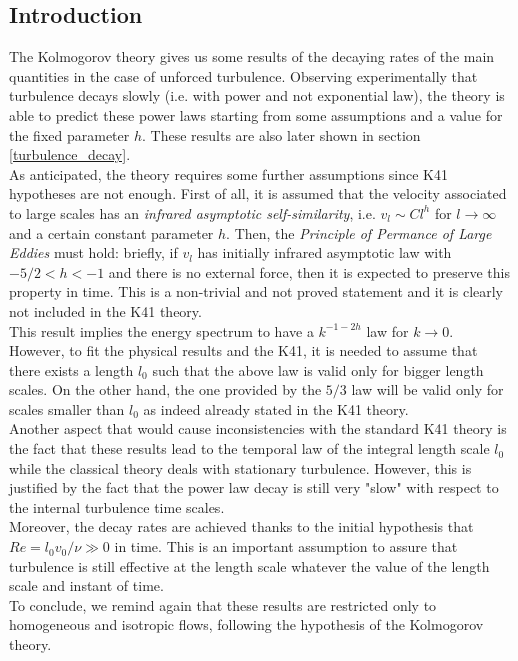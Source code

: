 \documentclass[11pt,titlepage]{article}
\begin{document}
\subsection{Introduction} %
The Kolmogorov theory gives us some results of the decaying rates of the main quantities in the case of unforced turbulence. Observing experimentally that turbulence decays slowly (i.e. with power and not exponential law), the theory is able to predict these power laws starting from some assumptions and a value for the fixed parameter $h$. These results are also later shown in section \ref{turbulence_decay}. \\
As anticipated, the theory requires some further assumptions since K41 hypotheses are not enough. First of all, it is assumed that the velocity associated to large scales has an \emph{infrared asymptotic self-similarity}, i.e. $v_l \sim Cl^h$ for $l \rightarrow \infty$ and a certain constant parameter $h$. Then, the \emph{Principle of Permance of Large Eddies} must hold: briefly, if $v_l$ has initially infrared asymptotic law with $-5/2 < h < -1$ and there is no external force, then it is expected to preserve this property in time. This is a non-trivial and not proved statement and it is clearly not included in the K41 theory. \\
This result implies the energy spectrum to have a $k^{-1-2h}$ law for $k\rightarrow 0$. However, to fit the physical results and the K41, it is needed to assume that there exists a length $l_0$ such that the above law is valid only for bigger length scales. On the other hand, the one provided by the $5/3$ law will be valid only for scales smaller than $l_0$ as indeed already stated in the K41 theory. \\
Another aspect that would cause inconsistencies with the standard K41 theory is the fact that these results lead to the temporal law of the integral length scale $l_0$ while the classical theory deals with stationary turbulence. However, this is justified by the fact that the power law decay is still very "slow" with respect to the internal turbulence time scales. \\
Moreover, the decay rates are achieved thanks to the initial hypothesis that $Re = l_0 v_0/\nu \gg 0$ in time. This is an important assumption to assure that turbulence is still effective at the length scale whatever the value of the length scale and instant of time. \\
To conclude, we remind again that these results are restricted only to homogeneous and isotropic flows, following the hypothesis of the Kolmogorov theory.
\end{document}
